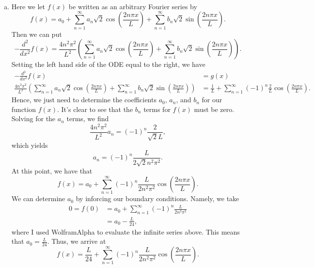 \documentclass[12pt]{article} %
\begin{document}
\begin{solution}~
	\begin{enumerate}[(a)]
		\item	Here we let $f(x)$ be written as an arbitrary Fourier series by
		\[
			f(x) = a_0 + \sum_{n=1}^\infty a_n \sqrt{2} \cos\left(\frac{2n \pi x}{L}\right) + \sum_{n=1}^\infty b_n \sqrt{2}\sin\left(\frac{2n\pi x}{L}\right).
		\]
		Then we can put
		\[
		-\frac{d^2}{dx^2} f(x) = \frac{4n^2\pi^2}{L^2} \left(\sum_{n=1}^\infty a_n \sqrt{2} \cos\left(\frac{2n \pi x}{L}\right) + \sum_{n=1}^\infty b_n \sqrt{2}\sin\left(\frac{2n\pi x}{L}\right)\right).
		\]
		Setting the left hand side of the ODE equal to the right, we have
		\begin{align*}
			-\frac{d^2}{dx^2}f(x) &= g(x)\\
			\frac{4n^2\pi^2}{L^2} \left(\sum_{n=1}^\infty a_n \sqrt{2} \cos\left(\frac{2n \pi x}{L}\right) + \sum_{n=1}^\infty b_n \sqrt{2}\sin\left(\frac{2n\pi x}{L}\right)\right) &= \frac{1}{L} + \sum_{n=1}^\infty (-1)^n \frac{2}{L} \cos\left(\frac{2n\pi x}{L}\right).
		\end{align*}
		Hence, we just need to determine the coefficients $a_0$, $a_n$, and $b_n$ for our function $f(x)$. It's clear to see that the $b_n$ terms for $f(x)$ must be zero. Solving for the $a_n$ terms, we find
		\[
		\frac{4n^2\pi^2}{L^2} a_n= (-1)^n \frac{2}{\sqrt{2}L},
		\]
		which yields
		\[
		a_n = (-1)^n \frac{L}{2\sqrt{2}n^2\pi^2}.
		\]
		At this point, we have that
		\[
		f(x) = a_0 + \sum_{n=1}^\infty (-1)^n \frac{L}{2n^2\pi^2}\cos\left(\frac{2n\pi x}{L}\right).
		\]
		We can determine $a_0$ by inforcing our boundary conditions. Namely, we take
		\begin{align*}
		0=f(0)&= a_0 + \sum_{n=1}^\infty (-1)^n \frac{L}{2n^2\pi^2}\\
		&=a_0 -\frac{L}{24},
		\end{align*}
		where I used WolframAlpha to evaluate the infinite series above.  This means that $a_0 = \frac{L}{24}$. Thus, we arrive at
		\[
		\boxed{f(x) = \frac{L}{24} + \sum_{n=1}^\infty (-1)^n \frac{L}{2n^2\pi^2}\cos\left(\frac{2n\pi x}{L}\right).}
		\]
		

\end{enumerate}
\end{solution}
\end{document}
